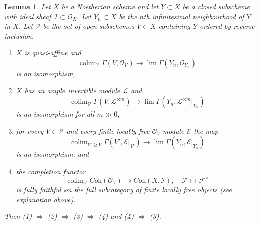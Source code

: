 \documentclass{stacks-project}
\theoremstyle{plain}
\newtheorem{lemma}[subsection]{Lemma}
\theoremstyle{definition}
\theoremstyle{remark}
\numberwithin{equation}{subsection}
\def\lim{\mathop{\mathrm{lim}}\nolimits}
\def\colim{\mathop{\mathrm{colim}}\nolimits}
\begin{document}
\begin{lemma}
\label{lemma-completion-fully-faithful-general}
Let $X$ be a Noetherian scheme and let $Y \subset X$ be a closed subscheme
with ideal sheaf $\mathcal{I} \subset \mathcal{O}_X$.
Let $Y_n \subset X$ be the $n$th infinitesimal neighbourhood of $Y$ in $X$.
Let $\mathcal{V}$ be the set of open subschemes $V \subset X$ containing $Y$
ordered by reverse inclusion.
\begin{enumerate}
\item $X$ is quasi-affine and
$$
\colim_\mathcal{V} \Gamma(V, \mathcal{O}_V)
\longrightarrow
\lim \Gamma(Y_n, \mathcal{O}_{Y_n})
$$
is an isomorphism,
\item $X$ has an ample invertible module $\mathcal{L}$ and
$$
\colim_\mathcal{V} \Gamma(V, \mathcal{L}^{\otimes m})
\longrightarrow
\lim \Gamma(Y_n, \mathcal{L}^{\otimes m}|_{Y_n})
$$
is an isomorphism for all $m \gg 0$,
\item for every $V \in \mathcal{V}$ and every finite locally free
$\mathcal{O}_V$-module $\mathcal{E}$ the map
$$
\colim_{V' \geq V} \Gamma(V', \mathcal{E}|_{V'})
\longrightarrow
\lim \Gamma(Y_n, \mathcal{E}|_{Y_n})
$$
is an isomorphism, and
\item the completion functor
$$
\colim_\mathcal{V} \textit{Coh}(\mathcal{O}_V)
\longrightarrow
\textit{Coh}(X, \mathcal{I}),
\quad
\mathcal{F} \longmapsto \mathcal{F}^\wedge
$$
is fully faithful on the full subcategory of
finite locally free objects (see explanation above).
\end{enumerate}
Then (1) $\Rightarrow$ (2) $\Rightarrow$ (3) $\Rightarrow$ (4)
and (4) $\Rightarrow$ (3).
\end{lemma}
\end{document}
